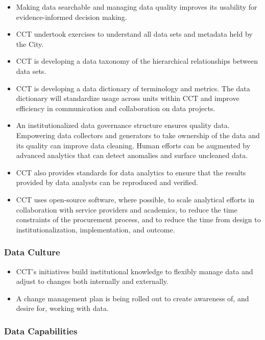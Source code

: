 \begin{itemize}
\tightlist
\item
  Making data searchable and managing data quality improves its usability for evidence-informed decision making.
\item
  CCT undertook exercises to understand all data sets and metadata held by the City.
\item
  CCT is developing a data taxonomy of the hierarchical relationships between data sets.
\item
  CCT is developing a data dictionary of terminology and metrics. The data dictionary will standardize usage across units within CCT and improve efficiency in communication and collaboration on data projects.
\item
  An institutionalized data governance structure ensures quality data. Empowering data collectors and generators to take ownership of the data and its quality can improve data cleaning. Human efforts can be augmented by advanced analytics that can detect anomalies and surface uncleaned data.
\item
  CCT also provides standards for data analytics to ensure that the results provided by data analysts can be reproduced and verified.
\item
  CCT uses open-source software, where possible, to scale analytical efforts in collaboration with service providers and academics, to reduce the time constraints of the procurement process, and to reduce the time from design to institutionalization, implementation, and outcome.
\end{itemize}

\hypertarget{data-culture}{%
\subsubsection*{Data Culture}\label{data-culture}}

\begin{itemize}
\tightlist
\item
  CCT's initiatives build institutional knowledge to flexibly manage data and adjust to changes both internally and externally.
\item
  A change management plan is being rolled out to create awareness of, and desire for, working with data.
\end{itemize}

\hypertarget{data-capabilities}{%
\subsubsection*{Data Capabilities}\label{data-capabilities}}

